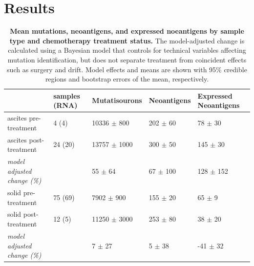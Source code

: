 \section*{Results}

\begin{table}[htbp]


\begin{tabular}{lllll}
\toprule
{} & samples (RNA) &         Mutatisourons &   Neoantigens & Expressed Neoantigens \\
\midrule
ascites pre-treatment                 &         4 (4) &   10336 $\pm$ 800 &  202 $\pm$ 60 &           78 $\pm$ 30 \\
ascites post-treatment                &       24 (20) &  13757 $\pm$ 1000 &  300 $\pm$ 50 &          145 $\pm$ 30 \\
\textit{model adjusted change (\%)} &               &       55 $\pm$ 64 &  67 $\pm$ 100 &         128 $\pm$ 152 \\
\hline
solid pre-treatment                   &       75 (69) &    7902 $\pm$ 900 &  155 $\pm$ 20 &            65 $\pm$ 9 \\
solid post-treatment                  &        12 (5) &  11250 $\pm$ 3000 &  253 $\pm$ 80 &           38 $\pm$ 20 \\
\textit{model adjusted change (\%)}   &               &        7 $\pm$ 27 &    5 $\pm$ 38 &          -41 $\pm$ 32 \\
\bottomrule
\end{tabular}



\caption{\textbf{Mean mutations, neoantigens, and expressed noeantigens by sample type and chemotherapy treatment status.} The model-adjusted change is calculated using a Bayesian model that controls for technical variables affecting mutation identification, but does not separate treatment from coincident effects such as surgery and drift. Model effects and means are shown with 95\% credible regions and bootstrap errors of the mean, respectively.}
\label{tab:cohort}
\end{table}

